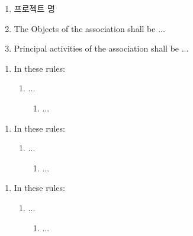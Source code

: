 


\begin{enumerate}
    \item 프로젝트 명
    
    \item The Objects of the association shall be ...
    \item Principal activities of the association shall be ...
\end{enumerate}


\begin{enumerate}
    \item In these rules:
    \begin{enumerate}
        \item ...
        \begin{enumerate}
            \item ...
        \end{enumerate}
    \end{enumerate}    
\end{enumerate}

\begin{enumerate}
    \item In these rules:
    \begin{enumerate}
        \item ...
        \begin{enumerate}
            \item ...
        \end{enumerate}
    \end{enumerate}    
\end{enumerate}

\begin{enumerate}
    \item In these rules:
    \begin{enumerate}
        \item ...
        \begin{enumerate}
            \item ...
        \end{enumerate}
    \end{enumerate}    
\end{enumerate}

